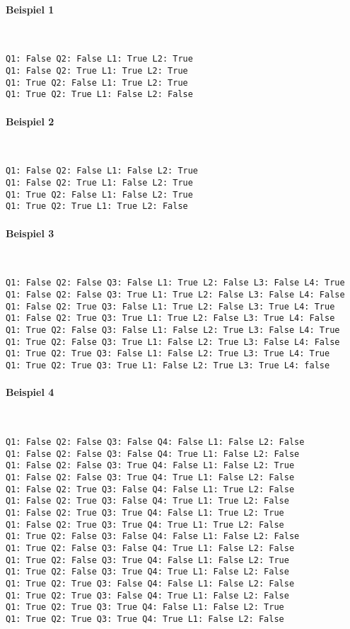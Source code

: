 \documentclass[a4paper,10pt,ngerman]{scrartcl}
\begin{document}
\paragraph{Beispiel 1} \mbox{} \\
\begin{lstlisting}[frame=tb]
Q1: False Q2: False L1: True L2: True 
Q1: False Q2: True L1: True L2: True 
Q1: True Q2: False L1: True L2: True 
Q1: True Q2: True L1: False L2: False
\end{lstlisting}


\paragraph{Beispiel 2} \mbox{} \\
\begin{lstlisting}[frame=tb]
Q1: False Q2: False L1: False L2: True
Q1: False Q2: True L1: False L2: True
Q1: True Q2: False L1: False L2: True
Q1: True Q2: True L1: True L2: False
\end{lstlisting}

\paragraph{Beispiel 3} \mbox{} \\
\begin{lstlisting}[frame=tb]
Q1: False Q2: False Q3: False L1: True L2: False L3: False L4: True
Q1: False Q2: False Q3: True L1: True L2: False L3: False L4: False
Q1: False Q2: True Q3: False L1: True L2: False L3: True L4: True
Q1: False Q2: True Q3: True L1: True L2: False L3: True L4: False
Q1: True Q2: False Q3: False L1: False L2: True L3: False L4: True
Q1: True Q2: False Q3: True L1: False L2: True L3: False L4: False
Q1: True Q2: True Q3: False L1: False L2: True L3: True L4: True
Q1: True Q2: True Q3: True L1: False L2: True L3: True L4: false
\end{lstlisting}

\paragraph{Beispiel 4} \mbox{} \\
\begin{lstlisting}[frame=tb]
Q1: False Q2: False Q3: False Q4: False L1: False L2: False
Q1: False Q2: False Q3: False Q4: True L1: False L2: False
Q1: False Q2: False Q3: True Q4: False L1: False L2: True
Q1: False Q2: False Q3: True Q4: True L1: False L2: False
Q1: False Q2: True Q3: False Q4: False L1: True L2: False
Q1: False Q2: True Q3: False Q4: True L1: True L2: False
Q1: False Q2: True Q3: True Q4: False L1: True L2: True
Q1: False Q2: True Q3: True Q4: True L1: True L2: False
Q1: True Q2: False Q3: False Q4: False L1: False L2: False
Q1: True Q2: False Q3: False Q4: True L1: False L2: False
Q1: True Q2: False Q3: True Q4: False L1: False L2: True
Q1: True Q2: False Q3: True Q4: True L1: False L2: False
Q1: True Q2: True Q3: False Q4: False L1: False L2: False
Q1: True Q2: True Q3: False Q4: True L1: False L2: False
Q1: True Q2: True Q3: True Q4: False L1: False L2: True
Q1: True Q2: True Q3: True Q4: True L1: False L2: False
\end{lstlisting}
\end{document}
